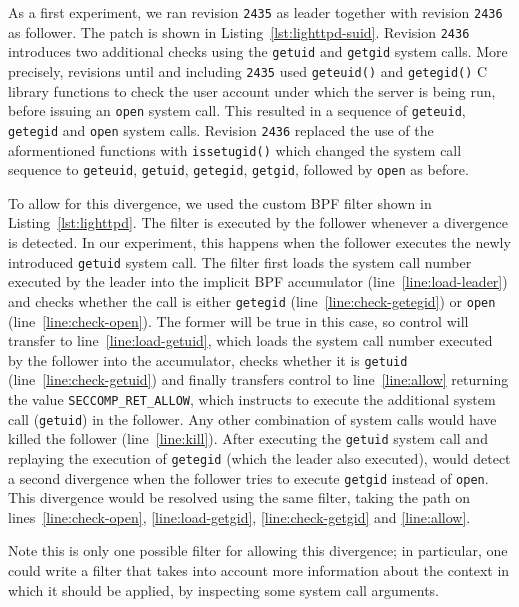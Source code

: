 As a first experiment, we ran revision \lstinline`2435` as leader together with
revision \lstinline`2436` as follower. The patch is shown in
Listing~\ref{lst:lighttpd-suid}. Revision \lstinline`2436` introduces two
additional checks using the \lstinline`getuid` and \lstinline`getgid` system
calls.  More precisely, revisions until and including \lstinline`2435` used
\lstinline`geteuid()` and \lstinline`getegid()` C library functions to check
the user account under which the server is being run, before issuing an
\lstinline`open` system call.  This resulted in a sequence of
\lstinline`geteuid`, \lstinline`getegid` and \lstinline`open` system calls.
Revision \lstinline`2436` replaced the use of the aformentioned functions with
\lstinline`issetugid()` which changed the system call sequence to
\lstinline`geteuid`, \lstinline`getuid`, \lstinline`getegid`,
\lstinline`getgid`, followed by \lstinline`open` as before.

To allow for this divergence, we used the custom BPF filter shown in
Listing~\ref{lst:lighttpd}.  The filter is executed by the
follower whenever a divergence is detected.  In our experiment, this
happens when the follower executes the newly introduced
\lstinline`getuid` system call. The filter first loads the system call
number executed by the leader into the implicit BPF accumulator
(line~\ref{line:load-leader}) and checks whether the call is either
\lstinline`getegid` (line~\ref{line:check-getegid}) or
\lstinline`open` (line~\ref{line:check-open}).  The former will be
true in this case, so control will transfer to
line~\ref{line:load-getuid}, which loads the system call number
executed by the follower into the accumulator, checks whether it is
\lstinline`getuid` (line~\ref{line:check-getuid}) and finally
transfers control to line~\ref{line:allow} returning the value
\lstinline`SECCOMP_RET_ALLOW`, which instructs \varan to execute the
additional system call (\ie \lstinline`getuid`) in the follower.  Any
other combination of system calls would have killed the follower
(line~\ref{line:kill}). After executing the \lstinline`getuid` system
call and replaying the execution of \lstinline`getegid` (which the
leader also executed), \varan would detect a second divergence when
the follower tries to execute \lstinline`getgid` instead of
\lstinline`open`. This divergence would be resolved using the same
filter, taking the path on lines~\ref{line:check-open},
\ref{line:load-getgid}, \ref{line:check-getgid} and \ref{line:allow}.

Note this is only one possible filter for allowing this divergence; in
particular, one could write a filter that takes into account more
information about the context in which it should be applied, \eg by
inspecting some system call arguments.

